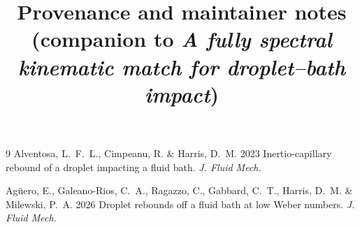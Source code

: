 \documentclass[11pt]{article}
\title{Provenance and maintainer notes\\ \large (companion to \emph{A fully spectral kinematic match for droplet--bath impact})}
\author{}
\date{}
\begin{document}
\maketitle



\begin{thebibliography}{9}
Alventosa, L.~F.~L., Cimpeanu, R. \& Harris, D.~M. 2023
Inertio-capillary rebound of a droplet impacting a fluid bath.
\textit{J. Fluid Mech.}

Ag\"uero, E., Galeano-Rios, C.~A., Ragazzo, C., Gabbard, C.~T., Harris, D.~M. \& Milewski, P.~A. 2026
Droplet rebounds off a fluid bath at low Weber numbers.
\textit{J. Fluid Mech.}
\end{thebibliography}
\end{document}
